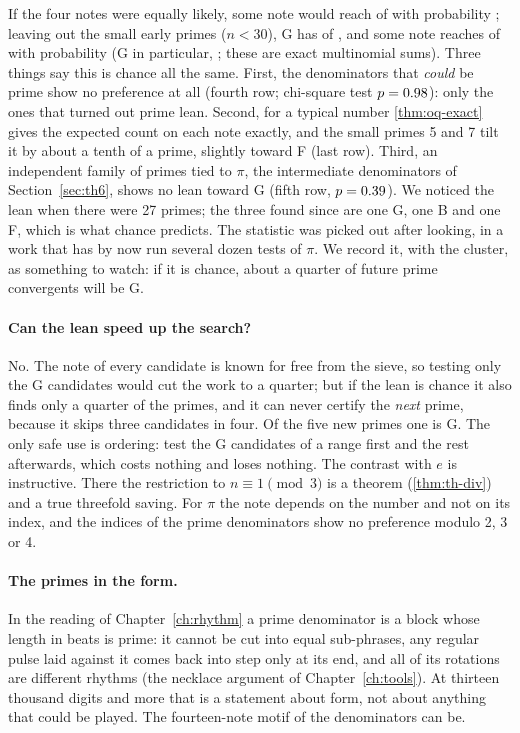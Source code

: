 If the four notes were equally likely, some note would reach \FiAllMax{} of \FiAllN{} with probability \FiTailAll; leaving out the small early primes ($n < 30$), G has \FiBigG{} of \FiBigN, and some note reaches \FiBigG{} of \FiBigN{} with probability \FiTailBigAny{} (G in particular, \FiTailBigG; these are exact multinomial sums). Three things say this is chance all the same. First, the denominators that \emph{could} be prime show no preference at all (fourth row; chi-square test $p = 0.98$): only the ones that turned out prime lean. Second, for a typical number \cref{thm:oq-exact} gives the expected count on each note exactly, and the small primes 5 and 7 tilt it by about a tenth of a prime, slightly toward F (last row). Third, an independent family of primes tied to $\pi$, the intermediate denominators of Section~\ref{sec:th6}, shows no lean toward G (fifth row, $p = 0.39$). We noticed the lean when there were 27 primes; the three found since are one G, one B and one F, which is what chance predicts. The statistic was picked out after looking, in a work that has by now run several dozen tests of $\pi$. We record it, with the cluster, as something to watch: if it is chance, about a quarter of future prime convergents will be G.

\paragraph{Can the lean speed up the search?} No. The note of every candidate is known for free from the sieve, so testing only the G candidates would cut the work to a quarter; but if the lean is chance it also finds only a quarter of the primes, and it can never certify the \emph{next} prime, because it skips three candidates in four. Of the five new primes one is G. The only safe use is ordering: test the G candidates of a range first and the rest afterwards, which costs nothing and loses nothing. The contrast with $e$ is instructive. There the restriction to $n \equiv 1 \pmod 3$ is a theorem (\cref{thm:th-div}) and a true threefold saving. For $\pi$ the note depends on the number and not on its index, and the indices of the prime denominators show no preference modulo 2, 3 or 4.

\paragraph{The primes in the form.} In the reading of Chapter~\ref{ch:rhythm} a prime denominator is a block whose length in beats is prime: it cannot be cut into equal sub-phrases, any regular pulse laid against it comes back into step only at its end, and all of its rotations are different rhythms (the necklace argument of Chapter~\ref{ch:tools}). At thirteen thousand digits and more that is a statement about form, not about anything that could be played. The fourteen-note motif of the denominators can be.

